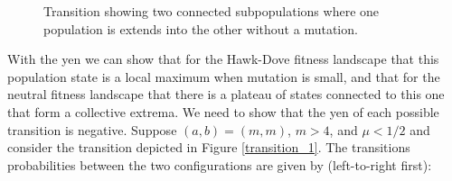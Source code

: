 \documentclass[aps,prd,11pt,notitlepage,nofootinbib,superscriptaddress,showkeys,letterpaper]{revtex4-1}
\begin{document}
\begin{figure}
\centering
{}

\caption{Transition showing two connected subpopulations where one population
is extends into the other without a mutation.}
\label{transition_2}
\end{figure}

With the yen we can show that for the Hawk-Dove fitness landscape that this
population state is a local maximum when mutation is small, and that for the neutral
fitness landscape that there is a plateau of states connected to this one that
form a collective extrema. We need to show that the yen of each possible
transition is negative. Suppose $(a, b) = (m, m)$, $m > 4$, and $\mu < 1/2$ and
consider the transition depicted in Figure \ref{transition_1}. The transitions
probabilities between the two configurations are given by (left-to-right first):
\end{document}

